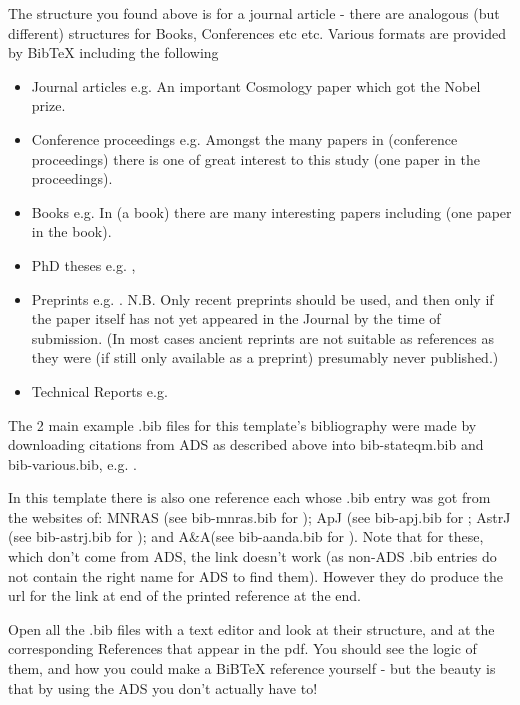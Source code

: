 \documentclass[twoside,fontsize=12pt,
     bibliography=totoc, %
     listof=totoc, %
     index=totoc, %
     onehalfspacing %
]{_MScDiss2017_cls}
\begin{document}
The structure you found above is for a journal article - there are analogous (but different) structures for Books, Conferences etc etc. 
Various formats are provided by BibTeX including the following  
\begin{itemize}{}
\item Journal articles e.g. An important Cosmology paper     which got the Nobel prize.
\item Conference proceedings e.g. Amongst the many papers in   (conference proceedings) there is one of great interest to this study  (one paper in the proceedings). 
\item Books e.g.  In   (a book) there are many interesting papers including   (one paper in the book).
\item PhD theses e.g. ,  
\item Preprints e.g. . N.B.  Only recent preprints should be used, and then only if the paper itself  has not yet appeared in the Journal by the time of submission. (In most cases ancient reprints are not suitable as references as they were (if still only available as a preprint) presumably never published.)
\item Technical Reports e.g. 
\end{itemize}

The 2 main example .bib files  for this template's bibliography were made by downloading citations from ADS as described above into bib-stateqm.bib and bib-various.bib, e.g.  . 

In this template there is also one reference each whose .bib entry was got from the websites of:  MNRAS (see bib-mnras.bib for ); ApJ (see bib-apj.bib for ; AstrJ (see bib-astrj.bib for ); and A\&A(see bib-aanda.bib for ). Note that for these, which don't come from ADS, the  link doesn't work (as non-ADS .bib entries  do not contain the right name for ADS to find them). However they do produce the url for the link at end of the printed reference at the end.

Open all the .bib files with a text editor and look at their structure, and at the corresponding References that appear in the pdf. You should see the logic of them, and how you could make a BiBTeX reference yourself - but the beauty is that by using the ADS you don't actually have to!
\end{document}

